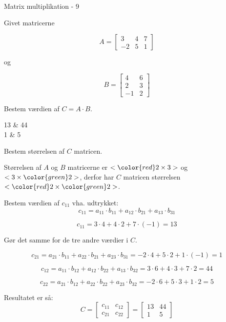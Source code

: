 \documentclass{article}
\begin{document}
\begin{exercise}{Matrix multiplikation - 9}
	
	Givet matricerne 
	
	\[
	A = \left[\begin{array}{rrr}
	3 & 4 & 7 \\ 
	-2 & 5 & 1
	\end{array} \right]
	\]
	
	og 
	
	\[
	B = \left[\begin{array}{rr}
	4 & 6 \\ 
	2 & 3 \\
	-1 & 2 
	\end{array} \right]
	\]
	
	Bestem værdien af $C = A \cdot B$.
	
	\begin{answermatrix}
		13 & 44  \\
		1 & 5 
	\end{answermatrix}
	
	\hint
	Bestem størrelsen af $C$ matricen.
	
	\hint
	Størrelsen af $A$ og $B$ matricerne er $<{\color{red} 2} \times 3>$ og $<3 \times {\color{green}2}>$, 
	derfor har $C$ matricen størrelsen $<{\color{red} 2} \times {\color{green}2}>$.
	
	\hint
	Bestem værdien af $c_{11}$ vha. udtrykket:
	\[
	c_{11} = a_{11} \cdot b_{11} + a_{12} \cdot b_{21} + a_{13} \cdot b_{31}
	\]
	
	\hint
	\[
	c_{11} = 3 \cdot 4 + 4 \cdot 2 + 7 \cdot (-1) = 13
	\]
	
	\hint
	Gør det samme for de tre andre værdier i $C$.
	
	\hint
	\[
		c_{21} = a_{21} \cdot b_{11} + a_{22} \cdot b_{21} + a_{23} \cdot b_{31}   = -2 \cdot 4 + 5 \cdot 2 + 1 \cdot (-1) = 1
	\]
	
	\hint
	\[
		c_{12} = a_{11} \cdot b_{12} + a_{12} \cdot b_{22} + a_{13} \cdot b_{32}  = 3 \cdot 6 + 4 \cdot 3 + 7 \cdot 2 = 44
	\]
	
	\hint
	\[
		c_{22} = a_{21} \cdot b_{12} + a_{22} \cdot b_{22} + a_{23} \cdot b_{32} = -2 \cdot 6 + 5 \cdot 3 + 1 \cdot 2 = 5
	\]
	
	
	\hint
	Resultatet er så:
	\[
	C = \left[\begin{array}{rr}
	c_{11} & c_{12} \\
	c_{21} & c_{22} 
	\end{array} \right] = 
	\left[\begin{array}{rr}
	13 & 44 \\
	1 & 5 
	\end{array} \right]
	\]
	
	
\end{exercise}
\end{document}

